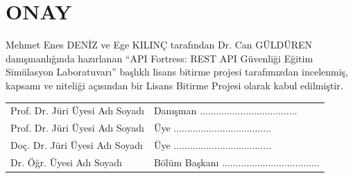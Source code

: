 \clearpage
\section*{ONAY}
\label{onay}
\setcounter{page}{0}

Mehmet Enes DENİZ ve Ege KILINÇ tarafından Dr. Can GÜLDÜREN danışmanlığında hazırlanan ``API Fortress: REST API Güvenliği Eğitim Simülasyon Laboratuvarı'' başlıklı lisans bitirme projesi tarafımızdan incelenmiş, kapsamı ve niteliği açısından bir Lisans Bitirme Projesi olarak kabul edilmiştir.

\vspace{1.5cm}

\begin{tabular}{ll}
    Prof. Dr. Jüri Üyesi Adı Soyadı & Danışman \hfill $\ldots\ldots\ldots\ldots\ldots\ldots\ldots\ldots\ldots\ldots\ldots\ldots$ \\[1.2cm]
    Prof. Dr. Jüri Üyesi Adı Soyadı & Üye \hfill $\ldots\ldots\ldots\ldots\ldots\ldots\ldots\ldots\ldots\ldots\ldots\ldots$ \\[1.2cm]
    Doç. Dr. Jüri Üyesi Adı Soyadı & Üye \hfill $\ldots\ldots\ldots\ldots\ldots\ldots\ldots\ldots\ldots\ldots\ldots\ldots$ \\[1.2cm]
    Dr. Öğr. Üyesi Adı Soyadı & Bölüm Başkanı \hfill $\ldots\ldots\ldots\ldots\ldots\ldots\ldots\ldots\ldots\ldots\ldots\ldots$ \\
\end{tabular}

\clearpage
